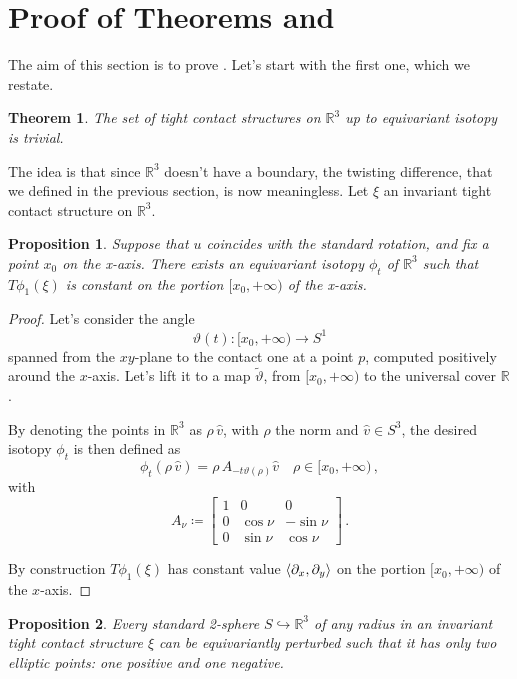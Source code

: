 \documentclass[a4paper, 11pt]{amsart}
\theoremstyle{plain}
\newtheorem{prop}{Proposition}[section]
\newtheorem{thmR}{Theorem}
\theoremstyle{definition}
\newcommand{\R}{\mathbb{R}}
\renewcommand{\theta}{\vartheta}
\DeclarePairedDelimiter{\ang}{\langle}{\rangle}
\begin{document}
\section{Proof of Theorems  and }\label{sec:proofmainthmopen}
The aim of this section is to prove . Let's start with the first one, which we restate.

\addtocounter{thmR}{-1}
\begin{thmR}
	The set of tight contact structures on $\R^3$ up to equivariant isotopy is trivial.
\end{thmR}

The idea is that since $\R^3$ doesn't have a boundary, the twisting difference, that we defined in the previous section, is now meaningless. Let $\xi$ an invariant tight contact structure on $\R^3$.
\begin{prop}\label{Rthreestandardxaxis}
	Suppose that $u$ coincides with the standard rotation, and fix a point $x_0$ on the x-axis. There exists an equivariant isotopy $\phi_t$ of $\R^3$ such that $T\phi_1(\xi)$ is constant on the portion $[x_0,+\infty)$ of the x-axis.
\end{prop}
\begin{proof}
	Let's consider the angle
	\[
		\theta(t) \colon [x_0,+\infty) \to S^1
	\]
	spanned from the $xy$-plane to the contact one at a point $p$, computed positively around the $x$-axis. Let's lift it to a map $\tilde{\theta}$, from $ [x_0,+\infty)$ to the universal cover $\R$.
	
	By denoting the points in $\R^3$ as $\rho\,\hat{v}$, with $\rho$ the norm and $\hat{v} \in S^3$, the desired isotopy $\phi_t$ is then defined as
	\[
		\phi_t(\rho\,\hat{v}) = \rho\,A_{-t\theta(\rho)}\hat{v} \quad \rho \in [x_0, +\infty)\,,
	\]
	with
	\[
		A_{\nu} \coloneqq
		\begin{bmatrix}
			1 & 0 & 0 \\
			0 & \cos\nu & -\sin\nu \\
			0 & \sin\nu & \cos\nu
		\end{bmatrix}\,.
	\]\vspace{0.2cm}
	
	By construction $T\phi_1(\xi)$ has constant value $\ang{\partial_x, \partial_y}$ on the portion $[x_0, +\infty)$ of the $x$-axis.
\end{proof}
\begin{prop}\label{spehrestandardizable}
	Every standard 2-sphere $S \hookrightarrow \R^3$ of any radius in an invariant tight contact structure $\xi$ can be equivariantly perturbed such that it has only two elliptic points: one positive and one negative.
\end{prop}
\end{document}
